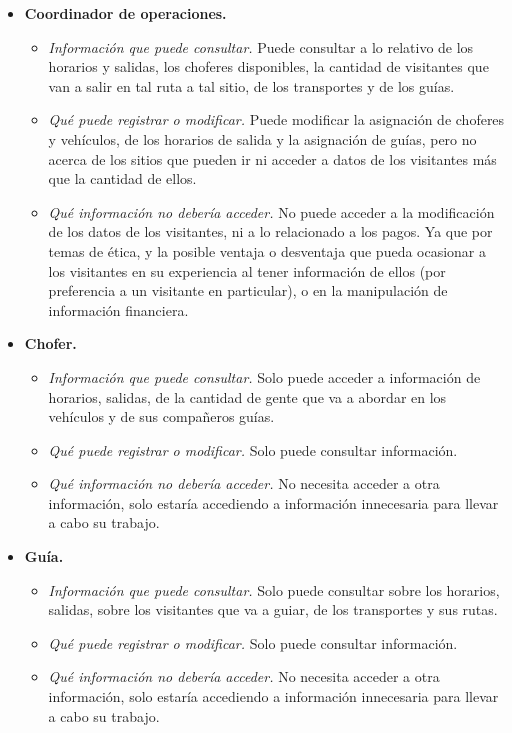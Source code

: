 \documentclass[12pt]{article}
\begin{document}
\begin{itemize}
\begin{itemize}
		\end{itemize}
	\item \textbf{Coordinador de operaciones.}
		\begin{itemize}
			\item \textit{Información que puede consultar.} Puede consultar a lo relativo de los horarios y salidas, los choferes disponibles, la cantidad de visitantes que van a salir en tal ruta a tal sitio, de los transportes y de los guías.
			\item \textit{Qué puede registrar o modificar.} Puede modificar la asignación de choferes y vehículos, de los horarios de salida y la asignación de guías, pero no acerca de los sitios que pueden ir ni acceder a datos de los visitantes más que la cantidad de ellos.
			\item \textit{Qué información no debería acceder.} No puede acceder a la modificación de los datos de los visitantes, ni a lo relacionado a los pagos. Ya que por temas de ética, y la posible ventaja o desventaja que pueda ocasionar a los visitantes en su experiencia al tener información de ellos (por preferencia a un visitante en particular), o en la manipulación de información financiera.
		\end{itemize}
	\item \textbf{Chofer.}
		\begin{itemize}
			\item \textit{Información que puede consultar.} Solo puede acceder a información de horarios, salidas, de la cantidad de gente que va a abordar en los vehículos y de sus compañeros guías.
			\item \textit{Qué puede registrar o modificar.} Solo puede consultar información.
			\item \textit{Qué información no debería acceder.} No necesita acceder a otra información, solo estaría accediendo a información innecesaria para llevar a cabo su trabajo.
		\end{itemize}
	\item \textbf{Guía.}
		\begin{itemize}
			\item \textit{Información que puede consultar.} Solo puede consultar sobre los horarios, salidas, sobre los visitantes que va a guiar, de los transportes y sus rutas.
			\item \textit{Qué puede registrar o modificar.} Solo puede consultar información.
			\item \textit{Qué información no debería acceder.} No necesita acceder a otra información, solo estaría accediendo a información innecesaria para llevar a cabo su trabajo.

\end{itemize}
\end{itemize}
\end{document}
